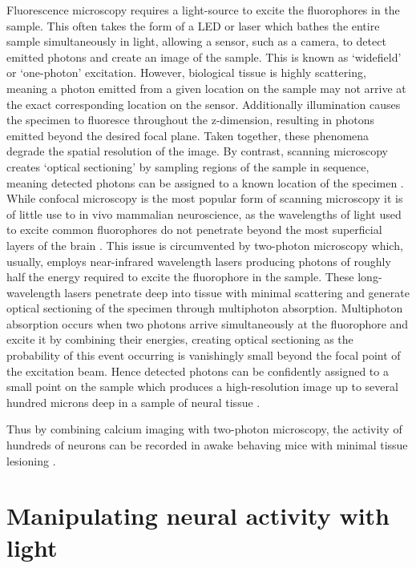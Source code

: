 Fluorescence microscopy \cite{lichtman_fluorescence_2005} requires a light-source to excite the fluorophores in the sample. This often takes the form of a LED or laser which bathes the entire sample simultaneously in light, allowing a sensor, such as a camera, to detect emitted photons and create an image of the sample. This is known as ‘widefield’ or ‘one-photon’ excitation. However, biological tissue is highly scattering, meaning a photon emitted from a given location on the sample may not arrive at the exact corresponding location on the sensor. Additionally illumination causes the specimen to fluoresce throughout the z-dimension, resulting in photons emitted beyond the desired focal plane. Taken together, these phenomena degrade the spatial resolution of the image. By contrast, scanning microscopy creates ‘optical sectioning’ by sampling regions of the sample in sequence, meaning detected photons can be assigned to a known location of the specimen \cite{lichtman_fluorescence_2005}. While confocal microscopy \cite{nwaneshiudu_introduction_2012} is the most popular form of scanning microscopy it is of little use to in vivo mammalian neuroscience, as the wavelengths of light used to excite common fluorophores do not penetrate beyond the most superficial layers of the brain \cite{helmchen_deep_2005}. This issue is circumvented by two-photon microscopy which, usually, employs near-infrared wavelength lasers producing photons of roughly half the energy required to excite the fluorophore in the sample. These long-wavelength lasers penetrate deep into tissue with minimal scattering and generate optical sectioning of the specimen through multiphoton absorption. Multiphoton absorption occurs when two photons arrive simultaneously at the fluorophore and excite it by combining their energies, creating optical sectioning as the probability of this event occurring is vanishingly small beyond the focal point of the excitation beam. Hence detected photons can be confidently assigned to a small point on the sample which produces a high-resolution image up to several hundred microns deep in a sample of neural tissue \cite{helmchen_deep_2005}.

Thus by combining calcium imaging with two-photon microscopy, the activity of hundreds of neurons can be recorded in awake behaving mice with minimal tissue lesioning \cite{helmchen_vivo_1999, stosiek_vivo_2003, lutcke_steady_2013, driscoll_dynamic_2017, stringer_spontaneous_2019}.

\section{Manipulating neural activity with light}

